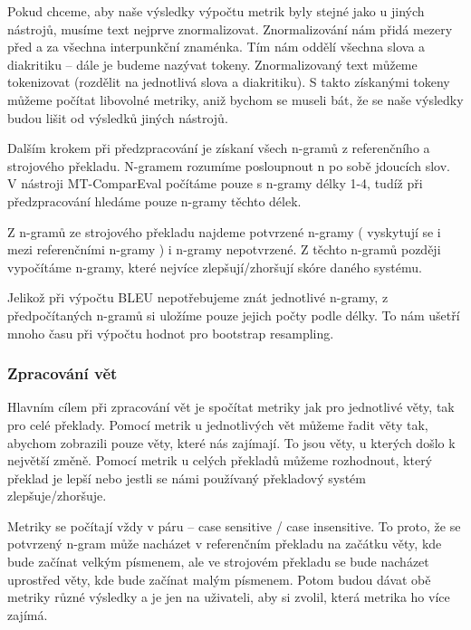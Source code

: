 Pokud chceme,
  aby naše výsledky výpočtu metrik byly stejné jako u jiných nástrojů,
  musíme text nejprve znormalizovat.
Znormalizování nám přidá mezery před a za všechna interpunkční znaménka.
Tím nám oddělí všechna slova a diakritiku -- dále je budeme nazývat tokeny.
Znormalizovaný text můžeme tokenizovat (rozdělit na jednotlivá slova a diakritiku).
S takto získanými tokeny můžeme počítat libovolné metriky,
  aniž bychom se museli bát,
  že se naše výsledky budou lišit od výsledků jiných nástrojů.

Dalším krokem při předzpracování je získaní všech \mbox{n-gramů} z referenčního a strojového překladu.
N-gramem rozumíme posloupnout n po sobě jdoucích slov.
V nástroji MT-ComparEval počítáme pouze s \mbox{n-gramy} délky 1-4,
  tudíž při předzpracování hledáme pouze \mbox{n-gramy} těchto délek. 

Z \mbox{n-gramů} ze strojového překladu najdeme potvrzené \mbox{n-gramy}
  ( vyskytují se i mezi referenčními \mbox{n-gramy} )
  i \mbox{n-gramy} nepotvrzené.
Z těchto \mbox{n-gramů} později vypočítáme \mbox{n-gramy},
  které nejvíce zlepšují/zhoršují skóre daného systému.
  
Jelikož při výpočtu BLEU nepotřebujeme znát jednotlivé \mbox{n-gramy},
  z předpočítaných \mbox{n-gramů} si uložíme pouze jejich počty podle délky.
To nám ušetří mnoho času při výpočtu hodnot pro bootstrap resampling.

\subsubsection{Zpracování vět}
Hlavním cílem při zpracování vět je spočítat metriky jak pro jednotlivé věty,
  tak pro celé překlady.
Pomocí metrik u jednotlivých vět můžeme řadit věty tak,
  abychom zobrazili pouze věty, 
  které nás zajímají.
To jsou věty, u kterých došlo k největší změně.
Pomocí metrik u celých překladů můžeme rozhodnout,
  který překlad je lepší
  nebo jestli se námi používaný překladový systém zlepšuje/zhoršuje.

Metriky se počítají vždy v páru -- case sensitive / case insensitive.
To proto, že se potvrzený \mbox{n-gram} může nacházet v referenčním překladu na začátku věty,
  kde bude začínat velkým písmenem,
  ale ve strojovém překladu se bude nacházet uprostřed věty,
  kde bude začínat malým písmenem.
Potom budou dávat obě metriky různé výsledky 
  a je jen na uživateli,
  aby si zvolil, která metrika ho více zajímá.

